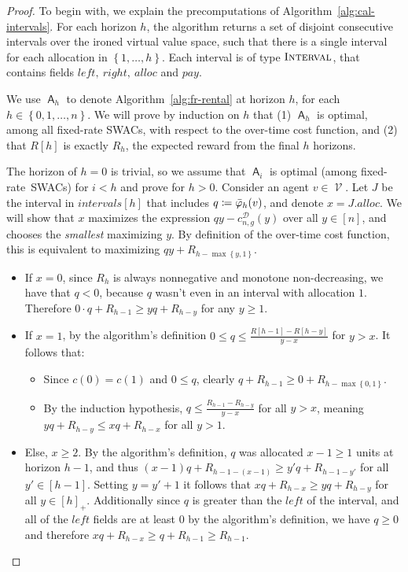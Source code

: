 \documentclass[11pt,letterpaper]{article}
\newcommand{\set}[1]{\left\{#1\right\}}
\newcommand{\fr}{fixed-rate\xspace}
\newcommand{\swacs}{SWACs\xspace}
\newcommand{\psqrrange}[1]{[#1]_+}
\newcommand{\sqrrange}[1]{[#1]}
\DeclareMathOperator{\A}{\auc{A}}
\DeclareMathOperator{\D}{\mathcal{D}}
\DeclareMathOperator{\V}{\mathcal{V}}
\newcommand{\g}{g}
\newcommand{\irn}{\Bar{\varphi}}
\theoremstyle{plain}
\newcommand{\auc}[1]{\mathsf{#1}}
\begin{document}
\begin{proof}
    To begin with, we explain the precomputations of Algorithm~\ref{alg:cal-intervals}. For each horizon $h$, the algorithm returns a set of disjoint consecutive intervals over the ironed virtual value space, such that there is a single interval for each allocation in $\set{1,\dots,h}$.
Each interval is of type $\textsc{Interval}$, that contains fields $left,\ right,\ alloc$ and $pay$.


    We use $\A_h$ to denote Algorithm~\ref{alg:fr-rental} at horizon $h$, for each $h\in\set{0,1,\dots,n}$. We will prove by induction on $h$ that (1) $\A_h$ is optimal, among all \fr \swacs, with respect to the over-time cost function, and (2) that $R[h]$ is exactly $R_h$, the expected reward from the final $h$ horizons.

    The horizon of $h=0$ is trivial, so we assume that $\A_i$ is  optimal (among \fr\ \swacs) for $i<h$ and prove for $h>0$. Consider an agent $v\in\V$. Let $J$ be the interval in $intervals[h]$ that includes $q\coloneq\irn_h(v)$, and denote $x=J.alloc$. We will show that $x$ maximizes the expression $qy-c_{n,\g}^{\boldsymbol{\D}}(y)$ over all $y\in\sqrrange{n}$, and chooses the \emph{smallest} maximizing $y$. By definition of the over-time cost function, this is equivalent to maximizing $qy+R_{h-\max\set{y,1}}$. 

    \begin{itemize}
        \item If $x=0$, since $R_{h}$ is always nonnegative and monotone non-decreasing, we have that $q<0$, because $q$ wasn't even in an interval with allocation $1$. Therefore $0\cdot q+R_{h-1}\geq yq+R_{h-y}$ for any $y\geq1$.
        \item If $x=1$, by the algorithm's definition $0\leq q\leq \frac{R[h-1]-R[h-y]}{y-x}$ for $y>x$. It follows that:
            \begin{itemize}
                \item Since $c(0)=c(1)$ and $0\leq q$, clearly $q+R_{h-1}\geq 0+R_{h-\max\set{0,1}}$.
                \item By the induction hypothesis, $q\leq \frac{R_{h-1}-R_{h-y}}{y-x}$ for all $y>x$, meaning $yq+R_{h-y}\leq xq+R_{h-x}$ for all $y>1$.
            \end{itemize}
        \item Else, $x\geq2$. By the algorithm's definition, $q$ was allocated $x-1\geq 1$ units at horizon $h-1$, and thus $(x-1)q+R_{h-1-(x-1)}\geq y'q+R_{h-1-y'}$ for all $y'\in\sqrrange{h-1}$.
        Setting $y=y'+1$ it follows that $xq+R_{h-x}\geq yq+R_{h-y}$ for all $y\in\psqrrange{h}$. Additionally since $q$ is greater than the $left$ of the interval, and all of the $left$ fields are at least $0$ by the algorithm's definition, we have $q\geq0$ and therefore $xq+R_{h-x}\geq q+R_{h-1}\geq R_{h-1}$.
    \end{itemize}


\end{proof}
\end{document}
